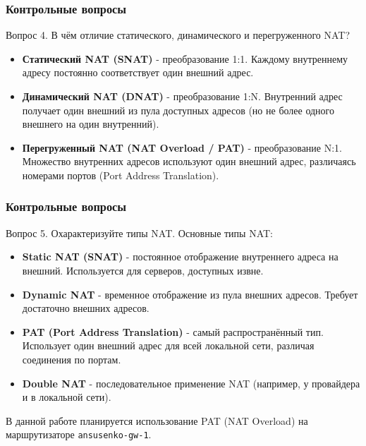 \begin{frame}
\frametitle{Контрольные вопросы}
\begin{block}{Вопрос 4. В чём отличие статического, динамического и перегруженного NAT?}
\begin{itemize}
    \item \textbf{Статический NAT (SNAT)} - преобразование 1:1. Каждому внутреннему адресу постоянно соответствует один внешний адрес.
    \item \textbf{Динамический NAT (DNAT)} - преобразование 1:N. Внутренний адрес получает один внешний из пула доступных адресов (но не более одного внешнего на один внутренний).
    \item \textbf{Перегруженный NAT (NAT Overload / PAT)} - преобразование N:1. Множество внутренних адресов используют один внешний адрес, различаясь номерами портов (Port Address Translation).
\end{itemize}
\end{block}
\end{frame}

\begin{frame}
\frametitle{Контрольные вопросы}
\begin{block}{Вопрос 5. Охарактеризуйте типы NAT.}
Основные типы NAT:
\begin{itemize}
    \item \textbf{Static NAT (SNAT)} - постоянное отображение внутреннего адреса на внешний. Используется для серверов, доступных извне.
    \item \textbf{Dynamic NAT} - временное отображение из пула внешних адресов. Требует достаточно внешних адресов.
    \item \textbf{PAT (Port Address Translation)} - самый распространённый тип. Использует один внешний адрес для всей локальной сети, различая соединения по портам.
    \item \textbf{Double NAT} - последовательное применение NAT (например, у провайдера и в локальной сети).
\end{itemize}
В данной работе планируется использование PAT (NAT Overload) на маршрутизаторе \texttt{ansusenko-gw-1}.
\end{block}
\end{frame}


